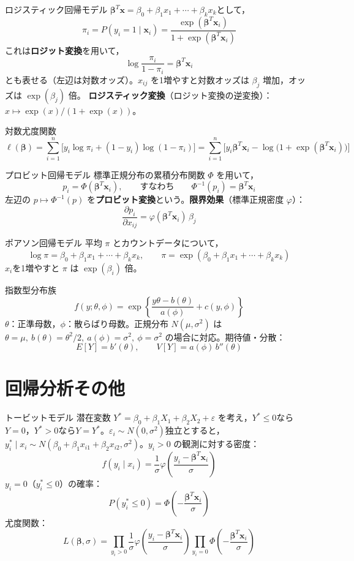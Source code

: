 \documentclass[a4paper,11pt]{ltjsarticle}
\begin{document}
\begin{term}{ロジスティック回帰モデル}
$\bm\beta^T\bm x=\beta_0+\beta_1x_1+\cdots+\beta_kx_k$として，
\[
\pi_i = P(y_i=1\mid \bm x_i) = \frac{\exp(\bm\beta^T\bm x_i)}{1+\exp(\bm\beta^T\bm x_i)}
\]
これは\textbf{ロジット変換}を用いて，
\[
\log\frac{\pi_i}{1-\pi_i} = \bm\beta^T\bm x_i
\]
とも表せる（左辺は対数オッズ）。$x_{ij}$ を1増やすと対数オッズは $\beta_j$ 増加，オッズは $\exp(\beta_j)$ 倍。
\textbf{ロジスティック変換}（ロジット変換の逆変換）：$x\mapsto \exp(x)/(1+\exp(x))$。
\end{term}

\begin{term}{対数尤度関数}
\[
\ell(\bm\beta) = \sum_{i=1}^n\Big[y_i\log\pi_i + (1-y_i)\log(1-\pi_i)\Big]
= \sum_{i=1}^n\Big[y_i \bm\beta^T\bm x_i - \log\big(1+\exp(\bm\beta^T\bm x_i)\big)\Big]
\]
\end{term}

\begin{term}{プロビット回帰モデル}
標準正規分布の累積分布関数 $\Phi$ を用いて，
\[
p_i = \Phi(\bm\beta^T\bm x_i), \qquad\text{すなわち}\qquad \Phi^{-1}(p_i) = \bm\beta^T\bm x_i
\]
左辺の $p\mapsto\Phi^{-1}(p)$ を\textbf{プロビット変換}という。\textbf{限界効果}（標準正規密度 $\varphi$）：
\[
\frac{\partial p_i}{\partial x_{ij}} = \varphi(\bm\beta^T\bm x_i)\,\beta_j
\]
\end{term}

\begin{term}{ポアソン回帰モデル}
平均 $\pi$ とカウントデータについて，
\[
\log \pi = \beta_0+\beta_1x_1+\cdots+\beta_kx_k, \qquad \pi = \exp(\beta_0+\beta_1x_1+\cdots+\beta_kx_k)
\]
$x_i$を1増やすと $\pi$ は $\exp(\beta_i)$ 倍。
\end{term}

\begin{term}{指数型分布族}
\[
f(y;\theta,\phi) = \exp\!\left\{\frac{y\theta-b(\theta)}{a(\phi)}+c(y,\phi)\right\}
\]
$\theta$：正準母数，$\phi$：散らばり母数。正規分布 $N(\mu,\sigma^2)$ は $\theta=\mu,\ b(\theta)=\theta^2/2,\ a(\phi)=\sigma^2,\ \phi=\sigma^2$ の場合に対応。期待値・分散：
\[
E[Y] = b'(\theta),\qquad V[Y] = a(\phi)\,b''(\theta)
\]
\end{term}

\section{回帰分析その他}

\begin{term}{トービットモデル}
潜在変数 $Y^*=\beta_0+\beta_1X_1+\beta_2X_2+\varepsilon$ を考え，$Y^*\le0$なら$Y=0$，$Y^*>0$なら$Y=Y^*$。$\varepsilon_i\sim N(0,\sigma^2)$独立とすると，$y_i^*\mid x_i \sim N(\beta_0+\beta_1x_{i1}+\beta_2x_{i2},\sigma^2)$。$y_i>0$ の観測に対する密度：
\[
f(y_i\mid x_i) = \frac1\sigma\varphi\!\left(\frac{y_i-\bm\beta^T\bm x_i}{\sigma}\right)
\]
$y_i=0$（$y_i^*\le0$）の確率：
\[
P(y_i^*\le0) = \Phi\!\left(-\frac{\bm\beta^T\bm x_i}{\sigma}\right)
\]
尤度関数：
\[
L(\bm\beta,\sigma) = \prod_{y_i>0} \frac1\sigma\varphi\!\left(\frac{y_i-\bm\beta^T\bm x_i}{\sigma}\right)
\prod_{y_i=0} \Phi\!\left(-\frac{\bm\beta^T\bm x_i}{\sigma}\right)
\]
\end{term}
\end{document}
